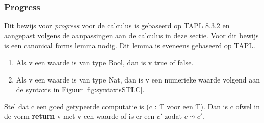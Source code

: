 \subsubsection{Progress}

Dit bewijs voor \emph{progress} voor de calculus is gebaseerd op TAPL 8.3.2 \cite{Pierce2002} en aangepast volgens de aanpassingen aan de calculus in deze sectie. Voor dit bewijs is een canonical forms lemma nodig. Dit lemma is eveneens gebaseerd op TAPL.\newline
\begin{lemma}
    \label{lem:CanFormArith}
     \begin{enumerate}
         \item Als v een waarde is van type Bool, dan is v true of false.
         \item Als v een waarde is van type Nat, dan is v een numerieke waarde volgend aan de syntaxis in Figuur \ref{fig:syntaxisSTLC}.
     \end{enumerate}
\end{lemma}
\begin{theorem}[Progress]
Stel dat c een goed getypeerde computatie is (c : T voor een T). Dan is c ofwel in de vorm \textbf{return} v met v een waarde of is er een $c'$ zodat $c \leadsto c'$.
\end{theorem}
